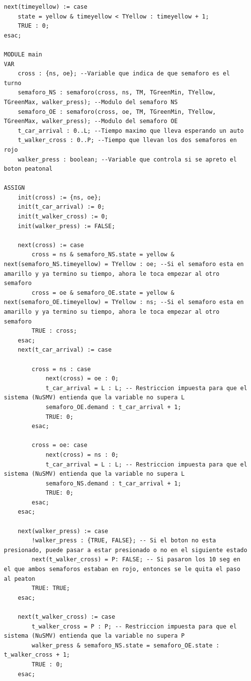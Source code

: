 \begin{lstlisting}[language=NuSMV, caption={Modelo con botón peatonal}]
next(timeyellow) := case
    state = yellow & timeyellow < TYellow : timeyellow + 1;
    TRUE : 0;
esac;

MODULE main
VAR
    cross : {ns, oe}; --Variable que indica de que semaforo es el turno
    semaforo_NS : semaforo(cross, ns, TM, TGreenMin, TYellow, TGreenMax, walker_press); --Modulo del semaforo NS
    semaforo_OE : semaforo(cross, oe, TM, TGreenMin, TYellow, TGreenMax, walker_press); --Modulo del semaforo OE
    t_car_arrival : 0..L; --Tiempo maximo que lleva esperando un auto
    t_walker_cross : 0..P; --Tiempo que llevan los dos semaforos en rojo
    walker_press : boolean; --Variable que controla si se apreto el boton peatonal

ASSIGN
    init(cross) := {ns, oe};
    init(t_car_arrival) := 0;
    init(t_walker_cross) := 0;
    init(walker_press) := FALSE;
    
    next(cross) := case
        cross = ns & semaforo_NS.state = yellow & next(semaforo_NS.timeyellow) = TYellow : oe; --Si el semaforo esta en amarillo y ya termino su tiempo, ahora le toca empezar al otro semaforo
        cross = oe & semaforo_OE.state = yellow & next(semaforo_OE.timeyellow) = TYellow : ns; --Si el semaforo esta en amarillo y ya termino su tiempo, ahora le toca empezar al otro semaforo
        TRUE : cross;
    esac;
    next(t_car_arrival) := case
        
        cross = ns : case
            next(cross) = oe : 0;
            t_car_arrival = L : L; -- Restriccion impuesta para que el sistema (NuSMV) entienda que la variable no supera L
            semaforo_OE.demand : t_car_arrival + 1;
            TRUE: 0; 
        esac;
        
        cross = oe: case
            next(cross) = ns : 0;
            t_car_arrival = L : L; -- Restriccion impuesta para que el sistema (NuSMV) entienda que la variable no supera L
            semaforo_NS.demand : t_car_arrival + 1;
            TRUE: 0;
        esac;
    esac;

    next(walker_press) := case
        !walker_press : {TRUE, FALSE}; -- Si el boton no esta presionado, puede pasar a estar presionado o no en el siguiente estado
        next(t_walker_cross) = P: FALSE; -- Si pasaron los 10 seg en el que ambos semaforos estaban en rojo, entonces se le quita el paso al peaton
        TRUE: TRUE;
    esac;

    next(t_walker_cross) := case 
        t_walker_cross = P : P; -- Restriccion impuesta para que el sistema (NuSMV) entienda que la variable no supera P
        walker_press & semaforo_NS.state = semaforo_OE.state : t_walker_cross + 1;
        TRUE : 0;
    esac;
    

\end{lstlisting}
